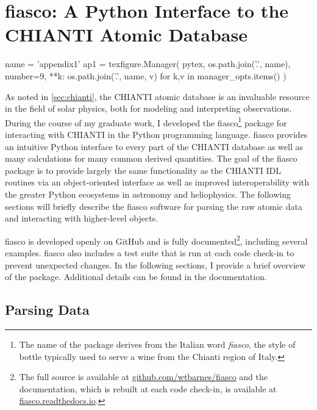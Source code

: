 \chapter{fiasco: A Python Interface to the CHIANTI Atomic Database}\label{ap:fiasco}
\thispagestyle{firstpageofchapterstyle}

\begin{pycode}[appendix1]
name = 'appendix1'
ap1 = texfigure.Manager(
    pytex,
    os.path.join('.', name),
    number=9,
    **{k: os.path.join('.', name, v) for k,v in manager_opts.items()}
)
\end{pycode}

As noted in \autoref{sec:chianti}, the CHIANTI atomic database is an invaluable resource in the field of solar physics, both for modeling and interpreting observations. During the course of my graduate work, I developed the fiasco\footnote{The name of the package derives from the Italian word \textit{fiasco}, the style of bottle typically used to serve a wine from the Chianti region of Italy.} package for interacting with CHIANTI in the Python programming language. fiasco provides an intuitive Python interface to every part of the CHIANTI database as well as many calculations for many common derived quantities. The goal of the fiasco package is to provide largely the same functionality as the CHIANTI IDL routines via an object-oriented interface \citep[similar to ChiantiPy,][]{landi_chiantiatomic_2012,barnes_chiantipy_2017} as well as improved interoperability with the greater Python ecosystems in astronomy and heliophysics. The following sections will briefly describe the fiasco software for parsing the raw atomic data and interacting with higher-level objects.

fiasco is developed openly on GitHub and is fully documented\footnote{The full source is available at \href{https://github.com/wtbarnes/fiasco}{github.com/wtbarnes/fiasco} and the documentation, which is rebuilt at each code check-in, is available at \href{https://fiasco.readthedocs.io/en/latest/}{fiasco.readthedocs.io}.}, including several examples. fiasco also includes a test suite that is run at each code check-in to prevent unexpected changes. In the following sections, I provide a brief overview of the package. Additional details can be found in the documentation.  

\section{Parsing Data}\label{sec:parsing-chianti}

